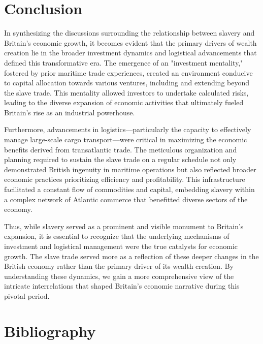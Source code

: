 \documentclass[a4paper,11pt]{article}
\begin{document}
\section{Conclusion}

In synthesizing the discussions surrounding the relationship between slavery and Britain's economic growth, it becomes evident that the primary drivers of wealth creation lie in the broader investment dynamics and logistical advancements that defined this transformative era. The emergence of an "investment mentality," fostered by prior maritime trade experiences, created an environment conducive to capital allocation towards various ventures, including and extending beyond the slave trade. This mentality allowed investors to undertake calculated risks, leading to the diverse expansion of economic activities that ultimately fueled Britain's rise as an industrial powerhouse.

Furthermore, advancements in logistics—particularly the capacity to effectively manage large-scale cargo transport—were critical in maximizing the economic benefits derived from transatlantic trade. The meticulous organization and planning required to sustain the slave trade on a regular schedule not only demonstrated British ingenuity in maritime operations but also reflected broader economic practices prioritizing efficiency and profitability. This infrastructure facilitated a constant flow of commodities and capital, embedding slavery within a complex network of Atlantic commerce that benefitted diverse sectors of the economy.

Thus, while slavery served as a prominent and visible monument to Britain's expansion, it is essential to recognize that the underlying mechanisms of investment and logistical management were the true catalysts for economic growth. The slave trade served more as a reflection of these deeper changes in the British economy rather than the primary driver of its wealth creation. By understanding these dynamics, we gain a more comprehensive view of the intricate interrelations that shaped Britain's economic narrative during this pivotal period.

\pagebreak

\section*{Bibliography}

\end{document}
